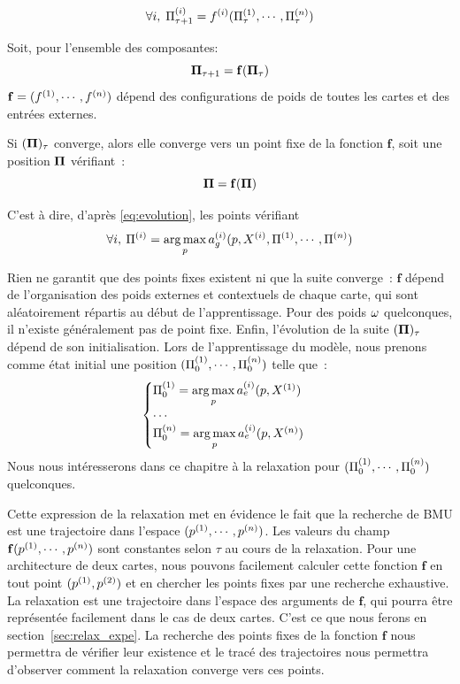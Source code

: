 \documentclass[../main]{subfiles}
\begin{document}
\begin{equation}
\forall i, \; \Pi^{({i})}_{\tau +1} = f^{({i})}(\Pi^{({1})}_\tau,\cdots,\Pi^{({n})}_\tau)
\label{eq:fonction}
\end{equation}

Soit, pour l'ensemble des composantes: 
\begin{equation}\label{eq:f}
\mathbf{\Pi}_{\tau+1} = \mathbf{f}(\mathbf{\Pi}_\tau)
\end{equation}
$\mathbf{f} = (f^{({1})}, \cdots, f^{({n})})$ dépend des configurations de poids de toutes les cartes et des entrées externes.

Si $(\mathbf{\Pi})_\tau$ converge, alors elle converge vers un point fixe de la fonction $\mathbf{f}$, soit une position $\mathbf{\Pi}$ vérifiant~:
\begin{equation}
\mathbf{\Pi} = \mathbf{f}(\mathbf{\Pi})
\label{eq:suite}
\end{equation}

C'est à dire, d'après \ref{eq:evolution}, les points vérifiant $$\forall i, \: \Pi^{({i})} = \operatorname*{arg\,max}\limits_p a_g^{({i})}(p, X^{({i})}, \Pi^{({1})}, \cdots, \Pi^{({n})})$$

Rien ne garantit que des points fixes existent ni que la suite converge~: $\mathbf{f}$ dépend de l'organisation des poids externes et contextuels de chaque carte, qui sont aléatoirement répartis au début de l'apprentissage.
Pour des poids $\omega$ quelconques, il n'existe généralement pas de point fixe.
Enfin, l'évolution de la suite $(\mathbf{\Pi})_{\tau}$ dépend de son initialisation.
Lors de l'apprentissage du modèle, nous prenons comme état initial une position $(\Pi^{({1})}_0, \cdots , \Pi^{({n})}_0)$  telle que~: 
\begin{equation}
\begin{cases}
\Pi^{({1})}_0 = \operatorname*{arg\,max}\limits_p a_e^{({i})}(p,X^{({1})})\\
\cdots \\
\Pi^{({n})}_0 = \operatorname*{arg\,max}\limits_p a_e^{({i})}(p,X^{({n})})\\
\end{cases}
\label{eq:init}
\end{equation}
Nous nous intéresserons dans ce chapitre à la relaxation pour $(\Pi^{({1})}_0, \cdots , \Pi^{({n})}_0)$ quelconques.

Cette expression de la relaxation met en évidence le fait que la recherche de BMU est une trajectoire dans l'espace $(p^{({1})}, \cdots, p^{({n})})$. Les valeurs du champ $\mathbf{f}(p^{({1})}, \cdots, p^{({n})})$ sont constantes selon $\tau$ au cours de la relaxation. Pour une architecture de deux cartes, nous pouvons facilement calculer cette fonction $\mathbf{f}$ en tout point $(p^{({1})}, p^{({2})})$ et en chercher les points fixes par une recherche exhaustive. 
La relaxation est une trajectoire dans l'espace des arguments de $\mathbf{f}$, qui pourra être représentée facilement dans le cas de deux cartes.
C'est ce que nous ferons en section~\ref{sec:relax_expe}.
La recherche des points fixes de la fonction $\mathbf{f}$ nous permettra de vérifier leur existence et le tracé des trajectoires nous permettra d'observer comment la relaxation converge vers ces points.
\end{document}
